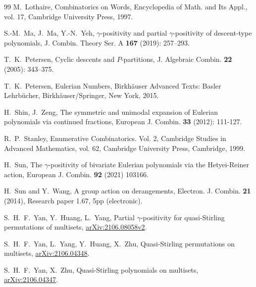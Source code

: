 \documentclass[11pt,reqno]{amsart}
\numberwithin{equation}{section}
\theoremstyle{plain}
\theoremstyle{definition}
\begin{document}
\begin{thebibliography}{99}
 M.~Lothaire, Combinatorics on Words, Encyclopedia of Math. and Its Appl., vol. 17, Cambridge University Press, 1997.

 S.-M.~Ma, J.~Ma, Y.-N.~Yeh, $\gamma$-positivity and partial $\gamma$-positivity of descent-type polynomials, J. Combin. Theory Ser. A {\bf 167} (2019): 257--293.


 T.~K.~Petersen, Cyclic descents and $P$-partitions, J. Algebraic Combin. {\bf 22} (2005): 343--375. 

 T.~K.~Petersen, Eulerian Numbers, Birkh\"auser Advanced Texts: Basler Lehrb\"ucher, Birkh\"auser/Springer, New York, 2015.

 H.~Shin, J.~Zeng, The symmetric and unimodal expansion of Eulerian polynomials via continued fractions, European J. Combin. {\bf 33} (2012): 111-127.

 R.~P.~Stanley, Enumerative Combinatorics. Vol. 2, Cambridge Studies in Advanced Mathematics, vol. 62, Cambridge University Press, Cambridge, 1999.

 H.~Sun, The $\gamma$-positivity of bivariate Eulerian polynomials via the Hetyei-Reiner action, European J. Combin. {\bf 92} (2021) 103166.

 H.~Sun and Y.~Wang, A group action on derangements, Electron. J. Combin. {\bf 21} (2014), Research paper 1.67, 5pp (electronic).

 S.~H.~F.~Yan, Y.~Huang, L.~Yang, Partial $\gamma$-positivity for quasi-Stirling permutations of multisets, \href{https://arxiv.org/abs/2106.08058v2}{arXiv:2106.08058v2}.

 S.~H.~F.~Yan, L.~Yang, Y.~Huang, X.~Zhu, Quasi-Stirling permutations on multisets, \href{https://arxiv.org/abs/2106.04348}{arXiv:2106.04348}.

 S.~H.~F.~Yan, X.~Zhu, Quasi-Stirling polynomials on multisets, \href{https://arxiv.org/abs/2106.04347}{arXiv:2106.04347}.





\end{thebibliography}
\end{document}
